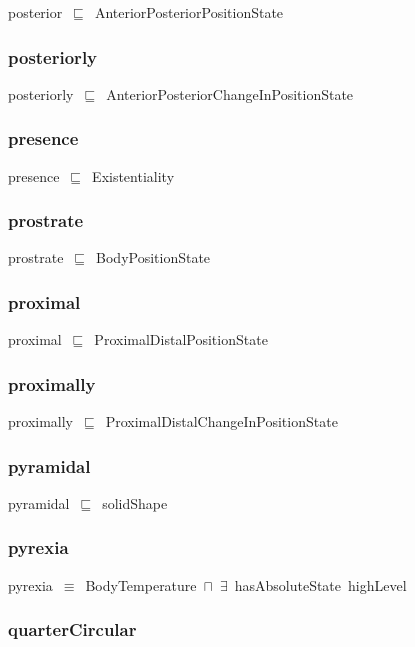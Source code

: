 \documentclass{article}
\begin{document}
posterior~\ensuremath{\sqsubseteq}~AnteriorPosteriorPositionState~

\subsubsection*{posteriorly}

posteriorly~\ensuremath{\sqsubseteq}~AnteriorPosteriorChangeInPositionState~

\subsubsection*{presence}

presence~\ensuremath{\sqsubseteq}~Existentiality~

\subsubsection*{prostrate}

prostrate~\ensuremath{\sqsubseteq}~BodyPositionState~

\subsubsection*{proximal}

proximal~\ensuremath{\sqsubseteq}~ProximalDistalPositionState~

\subsubsection*{proximally}

proximally~\ensuremath{\sqsubseteq}~ProximalDistalChangeInPositionState~

\subsubsection*{pyramidal}

pyramidal~\ensuremath{\sqsubseteq}~solidShape~

\subsubsection*{pyrexia}

pyrexia~\ensuremath{\equiv}~BodyTemperature~\ensuremath{\sqcap}~\ensuremath{\exists}~hasAbsoluteState~highLevel

\subsubsection*{quarterCircular}
\end{document}
